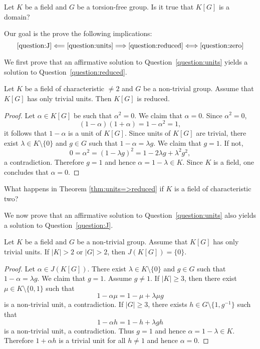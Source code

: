 \begin{question}
    \label{question:zero}
 	Let $K$ be a field and 
  $G$ be a torsion-free group. Is it true that 
 	$K[G]$ is a domain?
\end{question}

Our goal is the prove
the following implications:
\[
\ref{question:J}\Longleftarrow\ref{question:units}
\Longrightarrow\ref{question:reduced}
\Longleftrightarrow\ref{question:zero}
\]

We first prove that an affirmative solution to Question~\ref{question:units} 
yields a solution to Question~\ref{question:reduced}. 

\begin{theorem}
\label{thm:units=>reduced}
    Let $K$ be a field of characteristic $\ne2$ 
	and $G$ be a non-trivial group. Assume that $K[G]$ has only trivial units.
	Then $K[G]$ is reduced. 
\end{theorem}

\begin{proof}
	Let $\alpha\in K[G]$ be such that $\alpha^2=0$. We claim that 
	$\alpha=0$. Since $\alpha^2=0$, 
	\[
		(1-\alpha)(1+\alpha)=1-\alpha^2=1, 
	\]
	it follows that $1-\alpha$ is a unit of $K[G]$. Since units of $K[G]$ are 
	trivial, there exist $\lambda\in K\setminus\{0\}$ and $g\in G$ such that 
	$1-\alpha=\lambda g$. We claim that $g=1$. If not, 
	\[
		0=\alpha^2=(1-\lambda g)^2=1-2\lambda g+\lambda^2g^2,
	\]
	a contradiction. Therefore $g=1$ and hence $\alpha=1-\lambda\in K$. Since
	$K$ is a field, one concludes that $\alpha=0$.
\end{proof}

\begin{exercise}
    What happens in Theorem \ref{thm:units=>reduced} if $K$ is a field of characteristic two?
\end{exercise}

We now prove that an affirmative solution to Question~\ref{question:units} 
also yields a solution to Question~\ref{question:J}. 

\begin{theorem}
	Let $K$ be a field and $G$ be a non-trivial group. Assume that $K[G]$ has only trivial units. 
	If $|K|>2$ or $|G|>2$, then $J(K[G])=\{0\}$.
\end{theorem}

\begin{proof}
	Let $\alpha\in J(K[G])$. There exist $\lambda\in K\setminus\{0\}$ and $g\in
	G$ such that $1-\alpha=\lambda g$. We claim that $g=1$. Assume $g\ne 1$. 
	If $|K|\geq3$,
	then there exist $\mu\in K\setminus\{0,1\}$ such that
	\[
		1-\alpha\mu=1-\mu+\lambda\mu g 
	\]
	is a non-trivial unit, a contradiction.
	If $|G|\geq3$, there exists $h\in G\setminus\{1,g^{-1}\}$ such that
	\[
        1-\alpha h=1-h+\lambda gh
    \]
    is a non-trivial unit, a contradiction.  Thus
	$g=1$ and hence $\alpha=1-\lambda\in K$. Therefore $1+\alpha h$ is a
	trivial unit for all $h\ne 1$ and hence 	$\alpha=0$.
\end{proof}

